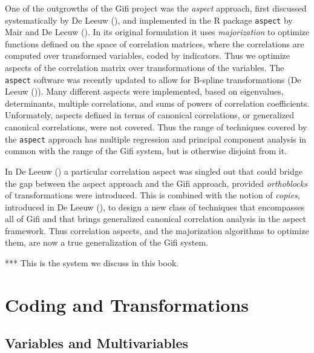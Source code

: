 \documentclass[
  12pt,
  letterpaper,
]{scrbook}
\begin{document}
One of the outgrowths of the Gifi project was the \emph{aspect}
approach, first discussed systematically by De Leeuw
(), and implemented in the R package
\texttt{aspect} by Mair and De Leeuw
(). In its original formulation it
uses \emph{majorization} to optimize functions defined on the space of
correlation matrices, where the correlations are computed over
transformed variables, coded by indicators. Thus we optimize aspects of
the correlation matrix over transformations of the variables. The
\texttt{aspect} software was recently updated to allow for B-spline
transformations (De Leeuw ()). Many
different aspects were implemented, based on eigenvalues, determinants,
multiple correlations, and sums of powers of correlation coefficients.
Unformately, aspects defined in terms of canonical correlations, or
generalized canonical correlations, were not covered. Thus the range of
techniques covered by the \texttt{aspect} approach has multiple
regression and principal component analysis in common with the range of
the Gifi system, but is otherwise disjoint from it.

In De Leeuw () a particular
correlation aspect was singled out that could bridge the gap between the
aspect approach and the Gifi approach, provided \emph{orthoblocks} of
transformations were introduced. This is combined with the notion of
\emph{copies}, introduced in De Leeuw
(), to design a new class of
techniques that encompasses all of Gifi and that brings generalized
canonical correlation analysis in the aspect framework. Thus correlation
aspects, and the majorization algorithms to optimize them, are now a
true generalization of the Gifi system.

*** This is the system we discuss in this book.


\chapter{Coding and Transformations}\label{coding-and-transformations}

\section{Variables and
Multivariables}\label{variables-and-multivariables}
\end{document}
